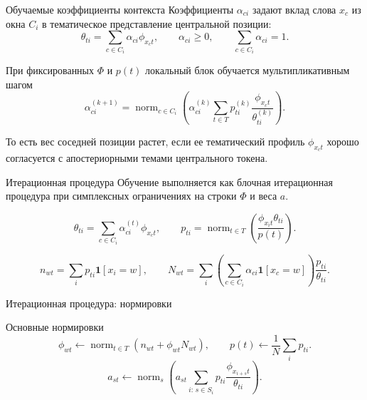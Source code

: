 \documentclass[aspectratio=169]{beamer}
\newcommand{\normop}{\operatorname{norm}}
\begin{document}
\begin{frame}{Обучаемые коэффициенты контекста}
    \small
    Коэффициенты \(\alpha_{ci}\) задают вклад слова \(x_c\) из окна \(C_i\) в
    тематическое представление центральной позиции:
    \[
        \theta_{ti}=\sum_{c\in C_i}\alpha_{ci}\phi_{x_c t},
        \qquad
        \alpha_{ci}\ge 0,
        \qquad
        \sum_{c\in C_i}\alpha_{ci}=1.
    \]

    При фиксированных \(\Phi\) и \(p(t)\) локальный блок обучается
    мультипликативным шагом
    \[
        \alpha_{ci}^{(k+1)}
        =
        \normop_{c\in C_i}\left(
        \alpha_{ci}^{(k)}
        \sum_{t\in T}p_{ti}^{(k)}
        \frac{\phi_{x_c t}}{\theta_{ti}^{(k)}}
        \right).
    \]

    То есть вес соседней позиции растет, если ее тематический профиль
    \(\phi_{x_c t}\) хорошо согласуется с апостериорными темами центрального
    токена.
\end{frame}

\begin{frame}{Итерационная процедура}
    \small
    Обучение выполняется как блочная итерационная процедура при симплексных
    ограничениях на строки \(\Phi\) и веса \(a\).

    \[
        \theta_{ti}=\sum_{c\in C_i}\alpha^{(t)}_{ci}\phi_{x_c t},
        \qquad
        p_{ti}=
        \normop_{t\in T}\left(\frac{\phi_{x_i t}\theta_{ti}}{p(t)}\right).
    \]

    \[
        n_{wt}=\sum_i p_{ti}\mathbf{1}[x_i=w],
        \qquad
        N_{wt}=\sum_i
        \left(\sum_{c\in C_i}\alpha_{ci}\mathbf{1}[x_c=w]\right)
        \frac{p_{ti}}{\theta_{ti}}.
    \]

\end{frame}

\begin{frame}{Итерационная процедура: нормировки}
    \small
    \begin{block}{Основные нормировки}
        \[
        \phi_{wt}\leftarrow
        \normop_{t\in T}
        \left(n_{wt}+\phi_{wt}N_{wt}\right),
        \qquad
        p(t)\leftarrow \frac{1}{N}\sum_i p_{ti}.
        \]
        \[
        a_{st}\leftarrow
        \normop_{s}
        \left(
        a_{st}\sum_{i:\,s\in S_i}
        p_{ti}\frac{\phi_{x_{i+s}t}}{\theta_{ti}}
        \right).
        \]
    \end{block}

    
\end{frame}
\end{document}
